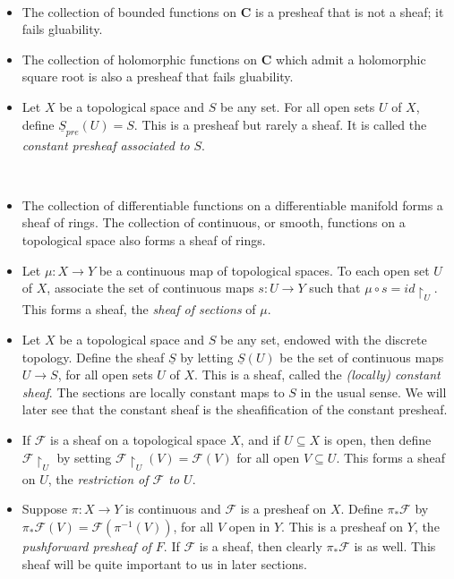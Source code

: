 \documentclass[11pt,openany]{book} %
\begin{document}
\begin{example}\
\begin{itemize}
	\item The collection of bounded functions on $\mathbf{C}$ is a presheaf that is not a sheaf; it fails gluability.
    \item The collection of holomorphic functions on $\mathbf{C}$ which admit a holomorphic square root is also a presheaf that fails gluability.
    \item Let $X$ be a topological space and $S$ be any set. For all open sets $U$ of $X$, define $\underline{S}_{pre}(U) = S$. This is a presheaf but rarely a sheaf. It is called the \emph{constant presheaf associated to} $S$.
\end{itemize}
\end{example}
\medskip
\begin{example}\
\begin{itemize}
	\item The collection of differentiable functions on a differentiable manifold forms a sheaf of rings. The collection of continuous, or smooth, functions on a topological space also forms a sheaf of rings.
    \item Let $\mu : X \to Y$ be a continuous map of topological spaces. To each open set $U$ of $X$, associate the set of continuous maps $s : U \to Y$ such that $\mu \circ s = id\restriction_U$. This forms a sheaf, the \emph{sheaf of sections} of $\mu$.
    \item Let $X$ be a topological space and $S$ be any set, endowed with the discrete topology. Define the sheaf $\underline{S}$ by letting $\underline{S}(U)$ be the set of continuous maps $U \to S$, for all open sets $U$ of $X$. This is a sheaf, called the \emph{(locally) constant sheaf}. The sections are locally constant maps to $S$ in the usual sense. We will later see that the constant sheaf is the sheafification of the constant presheaf.
    \item If $\mathcal{F}$ is a sheaf on a topological space $X$, and if $U \subseteq X$ is open, then define $\mathcal{F}\restriction_U$ by setting $\mathcal{F}\restriction_U(V) = \mathcal{F}(V)$ for all open $V \subseteq U$. This forms a sheaf on $U$, the \emph{restriction of $\mathcal{F}$ to $U$}.
    \item Suppose $\pi : X \to Y$ is continuous and $\mathcal{F}$ is a presheaf on $X$. Define $\pi_*\mathcal{F}$ by $\pi_*\mathcal{F}(V) = \mathcal{F}(\pi^{-1}(V))$, for all $V$ open in $Y$. This is a presheaf on $Y$, the \emph{pushforward presheaf of $F$}. If $\mathcal{F}$ is a sheaf, then clearly $\pi_*\mathcal{F}$ is as well. This sheaf will be quite important to us in later sections.
\end{itemize}
\end{example}
\hfill
\end{document}
